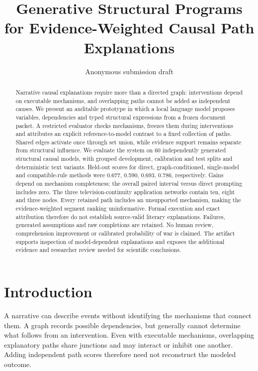 \documentclass{svproc}
\begin{document}
\mainmatter
\title{Generative Structural Programs for Evidence-Weighted Causal Path Explanations}
\author{Anonymous submission draft}
\maketitle
\begin{abstract}
Narrative causal explanations require more than a directed graph: interventions depend on executable mechanisms, and overlapping paths cannot be added as independent causes. We present an auditable prototype in which a local language model proposes variables, dependencies and typed structural expressions from a frozen document packet. A restricted evaluator checks mechanisms, freezes them during interventions and attributes an explicit reference-to-model contrast to a fixed collection of paths. Shared edges activate once through set union, while evidence support remains separate from structural influence. We evaluate the system on 60 independently generated structural causal models, with grouped development, calibration and test splits and deterministic text variants. Held-out scores for direct, graph-conditioned, single-model and compatible-rule methods were 0.677, 0.590, 0.693, 0.786, respectively. Gains depend on mechanism completeness; the overall paired interval versus direct prompting includes zero. The three television-continuity application networks contain ten, eight and three nodes. Every retained path includes an unsupported mechanism, making the evidence-weighted segment ranking uninformative. Formal execution and exact attribution therefore do not establish source-valid literary explanations. Failures, generated assumptions and raw completions are retained. No human review, comprehension improvement or calibrated probability of war is claimed. The artifact supports inspection of model-dependent explanations and exposes the additional evidence and researcher review needed for scientific conclusions.
\end{abstract}

\section{Introduction}
A narrative can describe events without identifying the mechanisms that connect them. A graph records possible dependencies, but generally cannot determine what follows from an intervention. Even with executable mechanisms, overlapping explanatory paths share junctions and may interact or inhibit one another. Adding independent path scores therefore need not reconstruct the modeled outcome.
\end{document}
